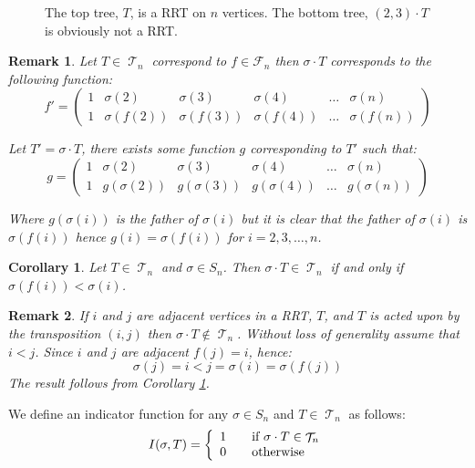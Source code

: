 \documentclass[10pt]{amsart} %
\newtheorem{remk}{Remark}
\newtheorem{corol}{Corollary}
\theoremstyle{definition}
\DeclareMathOperator{\T}{\mathcal{T}}
\begin{document}
\begin{figure}[H]
\begin{tikzpicture}[y=0.80pt,x=0.80pt,yscale=-1, inner sep=0pt, outer sep=0pt, scale = 0.35]
\end{tikzpicture}
\caption{The top tree, $T$, is a RRT on $n$ vertices. The bottom tree, $(2,3) \cdot T$ is obviously not a RRT.}\label{fig:1}
\end{figure}


\begin{remk}
Let $T \in \T_n$ correspond to $f \in \mathcal{F}_n$ then $\sigma \cdot T$ corresponds to the following  function:
\[ f'= \left(\begin{array}{cccccc}
     1& \sigma(2)&\sigma(3) &\sigma(4)& \dots & \sigma(n) \\
     1 & \sigma(f(2)) &\sigma(f(3)) &\sigma(f(4)) &\dots & \sigma(f(n))
    \end{array} \right)
\]

Let $T' = \sigma \cdot T$, there exists some function $g$ corresponding to $T'$ such that:
 \[ g= \left(\begin{array}{cccccc}
     1& \sigma(2)&\sigma(3) &\sigma(4)& \dots & \sigma(n) \\
     1 & g(\sigma(2)) &g(\sigma(3)) &g(\sigma(4)) &\dots & g(\sigma(n))
    \end{array} \right)
\]

Where $g(\sigma(i))$ is the father of $\sigma(i)$ but it is clear that the father of $\sigma(i)$ is $\sigma(f(i))$  hence $g(i) = \sigma(f(i))$ for $i = 2,3,\dots,n$.  
\end{remk}

\begin{corol}\label{cor:sig}
Let $T \in \T_n$ and $ \sigma \in S_n$.  Then  $\sigma  \cdot T \in \T_n$ if and only if $\sigma(f(i)) < \sigma(i) $. 
\end{corol}

\begin{remk}\label{remk:a} If $i$ and $j$ are adjacent vertices in a RRT, $T$, and $T$ is acted upon by the transposition $(i,j)$ then
 $\sigma \cdot T \notin \T_n$.  Without loss of generality assume that $i <j $.  Since $i$ and $j$ are adjacent $f(j) = i$, hence:
\[ \sigma(j) = i  < j = \sigma(i) =  \sigma(f(j))\]
The result follows from Corollary \ref{cor:sig}. 
\end{remk}

We define an indicator function for any $\sigma \in S_n$  and $ T \in \T_n$ as follows:
 \[ I(\sigma,T) = \left\{
  \begin{array}{l l}
    1 & \quad \text{if $\sigma \cdot T \in \T_n$}\\
    0 & \quad \text{otherwise}
  \end{array} \right.\]
\end{document}

